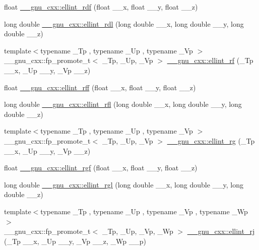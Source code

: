 \begin{DoxyCompactItemize}
\item 
float \hyperlink{group__gnu__math__spec__func_ga52e7cc797b9d199b7468cdbec6505357}{\+\_\+\+\_\+gnu\+\_\+cxx\+::ellint\+\_\+rdf} (float \+\_\+\+\_\+x, float \+\_\+\+\_\+y, float \+\_\+\+\_\+z)
\item 
long double \hyperlink{group__gnu__math__spec__func_ga68a38a5f320a7184cec4b120ddef6a65}{\+\_\+\+\_\+gnu\+\_\+cxx\+::ellint\+\_\+rdl} (long double \+\_\+\+\_\+x, long double \+\_\+\+\_\+y, long double \+\_\+\+\_\+z)
\item 
{\footnotesize template$<$typename \+\_\+\+Tp , typename \+\_\+\+Up , typename \+\_\+\+Vp $>$ }\\\+\_\+\+\_\+gnu\+\_\+cxx\+::fp\+\_\+promote\+\_\+t$<$ \+\_\+\+Tp, \+\_\+\+Up, \+\_\+\+Vp $>$ \hyperlink{group__gnu__math__spec__func_gae4859494464c7eaf98193f92b2235bc1}{\+\_\+\+\_\+gnu\+\_\+cxx\+::ellint\+\_\+rf} (\+\_\+\+Tp \+\_\+\+\_\+x, \+\_\+\+Up \+\_\+\+\_\+y, \+\_\+\+Vp \+\_\+\+\_\+z)
\item 
float \hyperlink{group__gnu__math__spec__func_ga39acf5c69a85f9b687478b32847156da}{\+\_\+\+\_\+gnu\+\_\+cxx\+::ellint\+\_\+rff} (float \+\_\+\+\_\+x, float \+\_\+\+\_\+y, float \+\_\+\+\_\+z)
\item 
long double \hyperlink{group__gnu__math__spec__func_ga38dd36b3db5bbe5da516d0cbe3ff1f21}{\+\_\+\+\_\+gnu\+\_\+cxx\+::ellint\+\_\+rfl} (long double \+\_\+\+\_\+x, long double \+\_\+\+\_\+y, long double \+\_\+\+\_\+z)
\item 
{\footnotesize template$<$typename \+\_\+\+Tp , typename \+\_\+\+Up , typename \+\_\+\+Vp $>$ }\\\+\_\+\+\_\+gnu\+\_\+cxx\+::fp\+\_\+promote\+\_\+t$<$ \+\_\+\+Tp, \+\_\+\+Up, \+\_\+\+Vp $>$ \hyperlink{group__gnu__math__spec__func_gadf618529d6106c1c1bc1e9212c4fed12}{\+\_\+\+\_\+gnu\+\_\+cxx\+::ellint\+\_\+rg} (\+\_\+\+Tp \+\_\+\+\_\+x, \+\_\+\+Up \+\_\+\+\_\+y, \+\_\+\+Vp \+\_\+\+\_\+z)
\item 
float \hyperlink{group__gnu__math__spec__func_ga7a4ab348bf312a3425501ac8a3d16494}{\+\_\+\+\_\+gnu\+\_\+cxx\+::ellint\+\_\+rgf} (float \+\_\+\+\_\+x, float \+\_\+\+\_\+y, float \+\_\+\+\_\+z)
\item 
long double \hyperlink{group__gnu__math__spec__func_ga563455d515ed845988552432108a21be}{\+\_\+\+\_\+gnu\+\_\+cxx\+::ellint\+\_\+rgl} (long double \+\_\+\+\_\+x, long double \+\_\+\+\_\+y, long double \+\_\+\+\_\+z)
\item 
{\footnotesize template$<$typename \+\_\+\+Tp , typename \+\_\+\+Up , typename \+\_\+\+Vp , typename \+\_\+\+Wp $>$ }\\\+\_\+\+\_\+gnu\+\_\+cxx\+::fp\+\_\+promote\+\_\+t$<$ \+\_\+\+Tp, \+\_\+\+Up, \+\_\+\+Vp, \+\_\+\+Wp $>$ \hyperlink{group__gnu__math__spec__func_gadccabc8df929cc03745286ed1574a3ba}{\+\_\+\+\_\+gnu\+\_\+cxx\+::ellint\+\_\+rj} (\+\_\+\+Tp \+\_\+\+\_\+x, \+\_\+\+Up \+\_\+\+\_\+y, \+\_\+\+Vp \+\_\+\+\_\+z, \+\_\+\+Wp \+\_\+\+\_\+p)

\end{DoxyCompactItemize}
